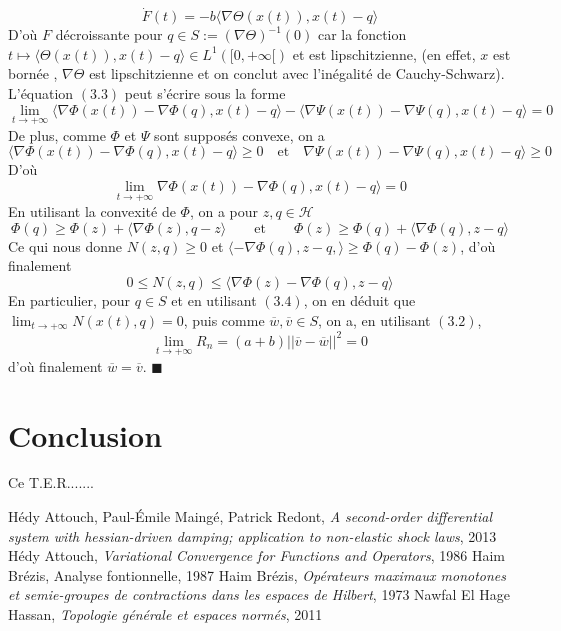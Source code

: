 \documentclass[a4paper,11pt]{book}
\theoremstyle{theo}
\newcommand*{\QEDA}{\hfill\ensuremath{\blacksquare}}%
\newcommand*{\Hi}{\mathcal{H}}
\begin{document}
$$ \dot{F}(t) = -b\langle \nabla\Theta(x(t)),x(t)-q\rangle $$
D'où $F$ décroissante pour $q\in S:=(\nabla\Theta)^{-1}(0)$
car la fonction $t\mapsto  \langle \Theta(x(t)),x(t)-q\rangle \in L^1([0,+\infty[)$ et est lipschitzienne, (en effet, $x$ est bornée , $\nabla\Theta$ est lipschitzienne et on conclut avec l'inégalité de Cauchy-Schwarz).
L'équation $(3.3)$ peut s'écrire sous la forme
$$ \lim_{t\to+\infty} \langle \nabla\Phi(x(t))-\nabla\Phi(q),x(t)-q \rangle - \langle \nabla\Psi(x(t))-\nabla\Psi(q),x(t)-q \rangle = 0$$
De plus, comme $\Phi$ et $\Psi$ sont supposés convexe, on a 
$$ \langle \nabla\Phi(x(t))-\nabla\Phi(q),x(t)-q \rangle \geq 0 \quad \text{et} \quad \nabla\Psi(x(t))-\nabla\Psi(q),x(t)-q \rangle \geq 0$$
D'où 
\begin{equation}
\displaystyle\lim_{t\to+\infty} \nabla\Phi(x(t))-\nabla\Phi(q),x(t)-q \rangle = 0
\end{equation}
En utilisant la convexité de $\Phi$, on a pour $z,q\in \Hi$
$$  \Phi(q)\geq \Phi(z) + \langle\nabla\Phi(z),q-z\rangle \qquad \text{et} \qquad  \Phi(z)\geq \Phi(q) + \langle\nabla\Phi(q),z-q\rangle $$
Ce qui nous donne $N(z,q) \geq 0$ et $\langle -\nabla\Phi(q),z-q,\rangle\geq \Phi(q)-\Phi(z)$, d'où finalement
$$ 0 \leq N(z,q) \leq \langle \nabla\Phi(z)-\nabla\Phi(q),z-q\rangle$$
En particulier, pour $q\in S$ et en utilisant $(3.4)$, on en déduit que $\lim_{t\to+\infty} N(x(t),q)=0$, puis comme $\overline{w},\overline{v}\in S$, on a, en utilisant $(3.2)$, 
$$\lim_{t\to+\infty} R_n = (a+b)||\overline{v}-\overline{w}||^2=0$$
d'où finalement $\overline{w}=\overline{v}$. \QEDA

\chapter*{Conclusion}
Ce T.E.R....... 
\newpage
\begin{thebibliography}{9}
Hédy Attouch, Paul-\'Emile Maingé, Patrick Redont, \emph{A second-order differential system with hessian-driven damping; application to non-elastic shock laws}, 2013
Hédy Attouch, \emph{Variational Convergence for Functions and Operators}, 1986
Haim Brézis, Analyse fontionnelle, 1987
Haim Brézis, \emph{Opérateurs maximaux monotones et semie-groupes de contractions dans les espaces de Hilbert}, 1973
Nawfal El Hage Hassan, \emph{Topologie générale et espaces normés}, 2011
\end{thebibliography}

\end{document}
